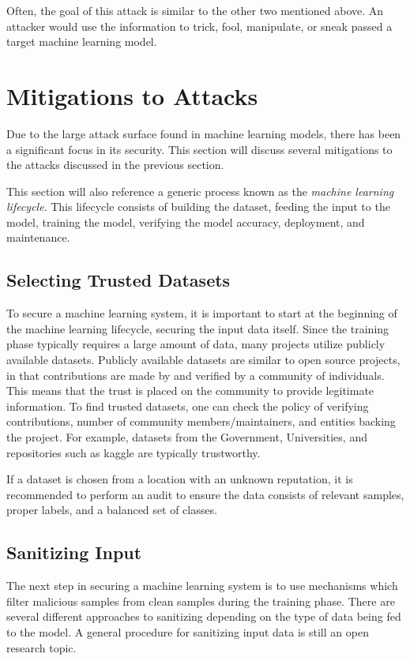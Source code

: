 \documentclass[11pt,conference]{IEEEtran}
\begin{document}
Often, the goal of this attack is similar to the other two mentioned above. An
attacker would use the information to trick, fool, manipulate, or sneak passed
a target machine learning model.

\section{Mitigations to Attacks}

Due to the large attack surface found in machine learning models, there has
been a significant focus in its security. This section will
discuss several mitigations to the attacks discussed in the previous
section. 

This section will also reference a generic process known as the \emph{machine
learning lifecycle}. This lifecycle consists of building the dataset, feeding
the input to the model, training the model, verifying the model accuracy,
deployment, and maintenance.

\subsection{Selecting Trusted Datasets}
To secure a machine learning system, it is important to start at the beginning
of the machine learning lifecycle, securing the input data itself. Since
the training phase typically requires a large amount of data,
many projects utilize publicly available datasets. Publicly available datasets
are similar to open source projects, in that contributions are made by and
verified by a community of individuals. This means that the trust is placed on
the community to provide legitimate information. To find trusted datasets, one
can check the policy of verifying contributions, number of community
members/maintainers, and entities backing the project. For example, datasets
from the Government, Universities, and repositories such as kaggle are
typically trustworthy.

If a dataset is chosen from a location with an unknown reputation, it is
recommended to perform an audit to ensure the data consists of relevant
samples, proper labels, and a balanced set of classes.

\subsection{Sanitizing Input}
The next step in securing a machine learning system is to use mechanisms which
filter malicious samples from clean samples during the training phase. There
are several different approaches to sanitizing depending on the type of data
being fed to the model. A general procedure for sanitizing input data is still
an open research topic.
\end{document}
